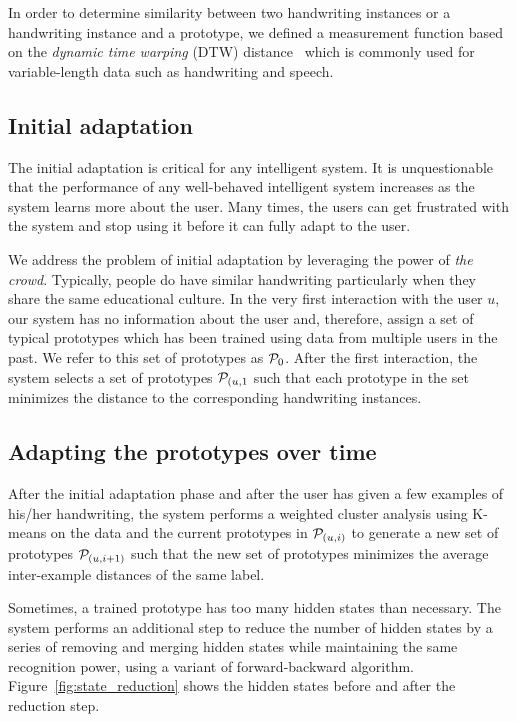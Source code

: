 \documentclass{sigchi}
\begin{document}
In order to determine similarity between two handwriting instances
or a handwriting instance and a prototype, we defined a measurement
function based on the {\it dynamic time warping} (DTW)
distance~\cite{Rabiner1993} which is commonly used for variable-length
data such as handwriting and speech.

\subsection{Initial adaptation}

The initial adaptation is critical for any intelligent system. It is
unquestionable that the performance of any well-behaved
intelligent system increases as the system learns more about the
user. Many times, the users can get frustrated with the system and stop
using it before it can fully adapt to the user.
 
We address the problem of initial adaptation by leveraging the power
of {\em the crowd}. Typically, people do have similar handwriting
particularly when they share the same educational culture. In the very
first interaction with the user $u$, our system has no information
about the user and, therefore, assign a set of typical prototypes
which has been trained using data from multiple users in the past.  We
refer to this set of prototypes as $\mathcal{P}_0$. After the first
interaction, the system selects a set of prototypes
$\mathcal{P}_{(u,1}$ such that each prototype in the set minimizes
the distance to the corresponding handwriting instances.


\subsection{Adapting the prototypes over time}

After the initial adaptation phase and after the user has given a few
examples of his/her handwriting, the system performs a weighted cluster
analysis using K-means on the data and the current prototypes in
$\mathcal{P}_{(u,i)}$ to generate a new set of prototypes
$\mathcal{P}_{(u,i+1)}$ such that the new set of prototypes minimizes the
average inter-example distances of the same label. 

Sometimes, a trained prototype has too many hidden states than
necessary. The system performs an additional step to reduce the number
of hidden states by a series of removing and merging hidden states
while maintaining the same recognition power, using a variant of
forward-backward algorithm. Figure~\ref{fig:state_reduction} shows the
hidden states before and after the reduction step.
\end{document}
